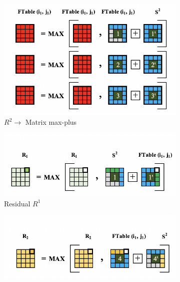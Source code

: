 \begin{figure}
\begin{subfigure}[b]{0.22\textwidth}
\label{fig:R_1_matrix_max_plus}
\end{subfigure}
\vspace{0.5mm}
\begin{subfigure}[b]{0.22\textwidth}
\centering
\includegraphics[width=\textwidth, scale=0.30, trim=4 4 4 4,clip]{content/figures/r2_max_plus.png}
\caption{$R^{2} \to$ Matrix max-plus}
\label{fig:R_2_matrix_max_plus}
\end{subfigure}
\begin{subfigure}[t]{0.22\textwidth}
\centering
\includegraphics[width=\textwidth, scale=0.30, trim=4 4 4 4,clip]{content/figures/r1_finalize.png}
\caption{Residual $R^{1}$ }
\label{fig:mono_R_1}
\end{subfigure}
\begin{subfigure}[t]{0.22\textwidth}
\centering
\includegraphics[width=\textwidth, scale=0.30, trim=4 4 4 4,clip]{content/figures/r2_finalize.png}

\end{subfigure}
\end{figure}

